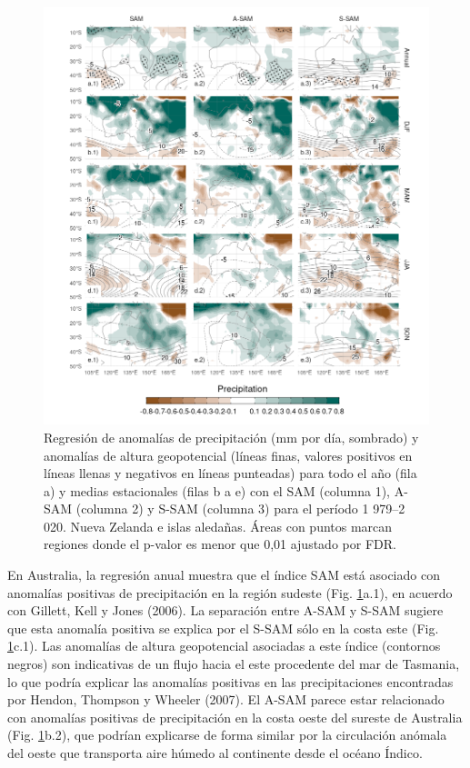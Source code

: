 \documentclass[12pt,oneside,a4paper]{reedthesis}
\begin{document}
\begin{figure}

{\centering \includegraphics{figures/30-sam/pp-regr-oceania-1} 

}

\caption{Regresión de anomalías de precipitación (mm por día, sombrado) y anomalías de altura geopotencial (líneas finas, valores positivos en líneas llenas y negativos en líneas punteadas) para todo el año (fila a) y medias estacionales (filas b a e) con el SAM (columna 1), A-SAM (columna 2) y S-SAM (columna 3) para el período 1 979--2 020. Nueva Zelanda e islas aledañas. Áreas con puntos marcan regiones donde el p-valor es menor que 0,01 ajustado por FDR.}\label{fig:pp-regr-oceania}
\end{figure}

En Australia, la regresión anual muestra que el índice SAM está asociado con anomalías positivas de precipitación en la región sudeste (Fig. \ref{fig:pp-regr-oceania}a.1), en acuerdo con Gillett, Kell y Jones (2006).
La separación entre A-SAM y S-SAM sugiere que esta anomalía positiva se explica por el S-SAM sólo en la costa este (Fig. \ref{fig:pp-regr-oceania}c.1).
Las anomalías de altura geopotencial asociadas a este índice (contornos negros) son indicativas de un flujo hacia el este procedente del mar de Tasmania, lo que podría explicar las anomalías positivas en las precipitaciones encontradas por Hendon, Thompson y Wheeler (2007).
El A-SAM parece estar relacionado con anomalías positivas de precipitación en la costa oeste del sureste de Australia (Fig. \ref{fig:pp-regr-oceania}b.2), que podrían explicarse de forma similar por la circulación anómala del oeste que transporta aire húmedo al continente desde el océano Índico.
\end{document}
